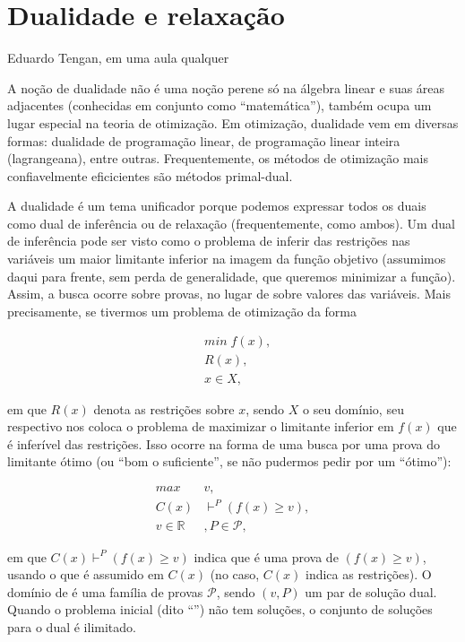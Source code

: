 \documentclass{article}
\begin{document}
\section{Dualidade e relaxação}

\epigraph{}{Eduardo Tengan, em uma aula qualquer}

A noção de dualidade não é uma noção perene só na álgebra linear e
suas áreas adjacentes (conhecidas em conjunto como ``matemática''),
também ocupa um lugar especial na teoria de otimização. Em otimização,
dualidade vem em diversas formas: dualidade de programação linear, de
programação linear inteira (lagrangeana), entre
outras. Frequentemente, os métodos de otimização mais confiavelmente
eficicientes são métodos primal-dual.

A dualidade é um tema unificador porque podemos expressar todos os
duais como dual de inferência ou de relaxação (frequentemente, como
ambos). Um dual de inferência pode ser visto como o problema de
inferir das restrições nas variáveis um maior limitante inferior na
imagem da função objetivo (assumimos daqui para frente, sem perda de
generalidade, que queremos minimizar a função). Assim, a busca ocorre
sobre provas, no lugar de sobre valores das variáveis. Mais
precisamente, se tivermos um problema de otimização da forma

\begin{align*}
  & min \; f(x),\\ & R(x),\\ & x \in X,
\end{align*}

\noindent em que $R(x)$ denota as restrições sobre $x$, sendo $X$ o
seu domínio, seu respectivo  nos coloca
o problema de maximizar o limitante inferior em $f(x)$ que é inferível
das restrições. Isso ocorre na forma de uma busca por uma prova do
limitante ótimo (ou ``bom o suficiente'', se não pudermos pedir por um
``ótimo''):

\begin{align*}
  max \; & v,\\ C(x) & \vdash^{P} (f(x) \geq v),\\ v \in \mathbb{R}&,
  P \in \mathcal{P},
\end{align*}

\noindent em que $C(x) \vdash^{P} (f(x) \geq v)$ indica que  é
uma prova de $(f(x) \geq v)$, usando o que é assumido em $C(x)$ (no
caso, $C(x)$ indica as restrições). O domínio de  é uma família
de provas $\mathcal{P}$, sendo $(v,P)$ um par de solução dual. Quando
o problema inicial (dito ``'') não tem soluções, o
conjunto de soluções para o dual é ilimitado.
\end{document}
